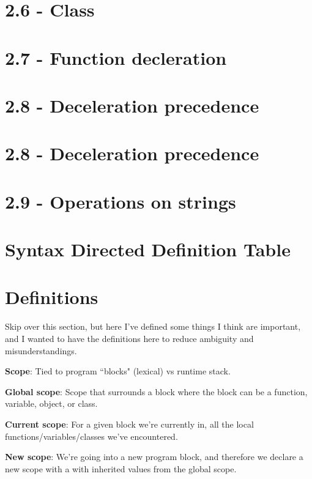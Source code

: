 \documentclass[11pt, oneside]{article}
\begin{document}
\section*{2.6 - Class}
\par

\section*{2.7 - Function decleration}
\par

\section*{2.8 - Deceleration precedence}
\par

\section*{2.8 - Deceleration precedence}
\par

\section*{2.9 - Operations on strings}
\par

\section*{Syntax Directed Definition Table}
\par

\section*{Definitions}
\par Skip over this section, but here I've defined some things I think are important, and I wanted to have the definitions here to reduce ambiguity and misunderstandings. 
\par \textbf{Scope}: Tied to program ``blocks" (lexical) vs runtime stack.
\par \textbf{Global scope}: Scope that surrounds a block where the block can be a function, variable, object, or class.
\par \textbf{Current scope}: For a given block we're currently in, all the local functions/variables/classes we've encountered.
\par \textbf{New scope}: We're going into a new program block, and therefore we declare a new scope with a with inherited values from the global scope.
\end{document}
